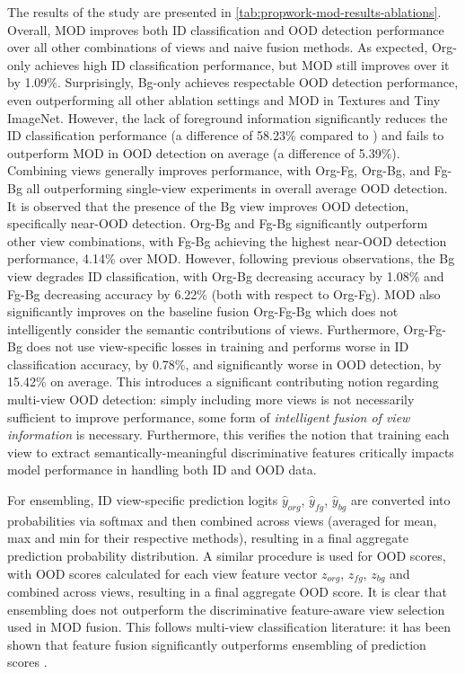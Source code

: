 The results of the study are presented in \ref{tab:propwork-mod-results-ablations}. Overall, MOD improves both ID classification and OOD detection performance over all other combinations of views and naive fusion methods. As expected, Org-only achieves high ID classification performance, but MOD still improves over it by 1.09\%. Surprisingly, Bg-only achieves respectable OOD detection performance, even outperforming all other ablation settings and MOD in Textures and Tiny ImageNet. However, the lack of foreground information significantly reduces the ID classification performance (a difference of 58.23\% compared to \sysa) and fails to outperform MOD in OOD detection on average (a difference of 5.39\%). Combining views generally improves performance, with Org-Fg, Org-Bg, and Fg-Bg all outperforming single-view experiments in overall average OOD detection. It is observed that the presence of the Bg view improves OOD detection, specifically near-OOD detection. Org-Bg and Fg-Bg significantly outperform other view combinations, with Fg-Bg achieving the highest near-OOD detection performance, 4.14\% over MOD. However, following previous observations, the Bg view degrades ID classification, with Org-Bg decreasing accuracy by 1.08\% and Fg-Bg decreasing accuracy by 6.22\% (both with respect to Org-Fg).
MOD also significantly improves on the baseline fusion Org-Fg-Bg which does not intelligently consider the semantic contributions of views. Furthermore, Org-Fg-Bg does not use view-specific losses in training and performs worse in ID classification accuracy, by 0.78\%, and significantly worse in OOD detection, by 15.42\% on average. This introduces a significant contributing notion regarding multi-view OOD detection: simply including more views is not necessarily sufficient to improve performance, some form of \textit{intelligent fusion of view information} is necessary.
Furthermore, this verifies the notion that training each view to extract semantically-meaningful discriminative features critically impacts model performance in handling both ID and OOD data. 

For ensembling, ID view-specific prediction logits $\hat{y}_{org}$, $\hat{y}_{fg}$, $\hat{y}_{bg}$ are converted into probabilities via softmax and then combined across views (averaged for mean, max and min for their respective methods), resulting in a final aggregate prediction probability distribution. A similar procedure is used for OOD scores, with OOD scores calculated for each view feature vector $z_{org}$, $z_{fg}$, $z_{bg}$ and combined across views, resulting in a final aggregate OOD score. It is clear that ensembling does not outperform the discriminative feature-aware view selection used in MOD fusion. This follows multi-view classification literature: it has been shown that feature fusion significantly outperforms ensembling of prediction scores \cite{seeland2021multi}.

